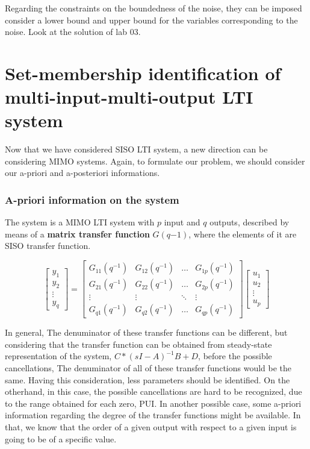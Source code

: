 Regarding the constraints on the boundedness of the noise, they can be imposed consider a lower bound and upper bound for the variables corresponding to the noise. Look at the solution of lab 03.

\newpage

\section{Set-membership identification of multi-input-multi-output LTI system}
Now that we have considered SISO LTI system, a new direction can be considering MIMO systems. Again, to formulate our problem, we should consider our a-priori and a-posteriori informations.

\subsubsection{A-priori information on the system}
The system is a MIMO LTI system with $p$ input and $q$ outputs, described by means of a \textbf{matrix transfer function} $G(q{-1})$, where the elements of it are SISO transfer function.


\[
\begin{bmatrix}
y_1 \\
y_2 \\
\vdots \\
y_q
\end{bmatrix}
=
\begin{bmatrix}
G_{11}(q^{-1}) & G_{12}(q^{-1}) & \dots & G_{1p}(q^{-1}) \\
G_{21}(q^{-1}) & G_{22}(q^{-1}) & \dots & G_{2p}(q^{-1}) \\
\vdots         & \vdots         & \ddots & \vdots         \\
G_{q1}(q^{-1}) & G_{q2}(q^{-1}) & \dots & G_{qp}(q^{-1})
\end{bmatrix}
\begin{bmatrix}
u_1 \\
u_2 \\
\vdots \\
u_p
\end{bmatrix}
\]

\begin{factbox}
In general, The denuminator of these transfer functions can be different, but considering that the transfer function can be obtained from steady-state representation of the system, $C*(sI-A)^{-1}B + D$, before the possible cancellations, The denuminator of all of these transfer functions would be the same. Having this consideration, less parameters should be identified. On the otherhand, in this case, the possible cancellations are hard to be recognized, due to the range obtained for each zero, PUI. In another possible case, some a-priori information regarding the degree of the transfer functions might be available. In that, we know that the order of a given output with respect to a given input is going to be of a specific value. 
\end{factbox}

